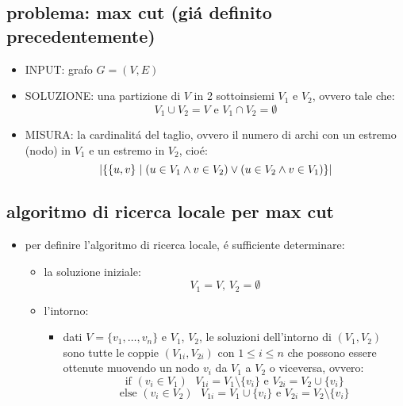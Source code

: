 \subsection*{problema: max cut (gi\'a definito precedentemente)}
\begin{flushleft}
	\begin{itemize}
		\item INPUT: grafo $G=(V,E)$
		\item SOLUZIONE: una partizione di $V$ in 2 sottoinsiemi $V_1$ e $V_2$, ovvero tale che:
			$$V_1\cup V_2=V\text{ e }V_1\cap V_2=\emptyset$$
		\item MISURA: la cardinalit\'a del taglio, ovvero il numero di archi con un estremo (nodo) in $V_1$ e un estremo in $V_2$, cio\'e:
			$$\vert\{\{u,v\}\hspace{0.1cm}\vert\hspace{0.1cm}(u\in V_1\land v\in V_2)\lor(u\in V_2\land v\in V_1)\}\vert$$
	\end{itemize}
\end{flushleft}


\subsection*{algoritmo di ricerca locale per max cut}
\begin{flushleft}
	\begin{itemize}
		\item per definire l'algoritmo di ricerca locale, \'e sufficiente determinare:
		\begin{itemize}
			\item la soluzione iniziale:
				$$V_1=V\text{, }V_2=\emptyset$$
			\item l'intorno:
			\begin{itemize}
				\item dati $V=\{v_1,\ldots,v_n\}$ e $V_1$, $V_2$, le soluzioni dell'intorno di $(V_1,V_2)$ sono tutte le coppie $(V_{1i},V_{2i})$ con $1\leq i\leq n$ che possono essere ottenute muovendo un nodo $v_i$ da $V_1$ a $V_2$ o viceversa, ovvero:
					$$\text{if }(v_i\in V_1)\text{ }V_{1i}=V_1\setminus\{v_i\}\text{ e }V_{2i}=V_2\cup\{v_i\}$$
					$$\text{else }(v_i\in V_2)\text{ }V_{1i}=V_1\cup\{v_i\}\text{ e }V_{2i}=V_2\setminus\{v_i\}$$
			\end{itemize}
		\end{itemize}
	\end{itemize}
\end{flushleft}


